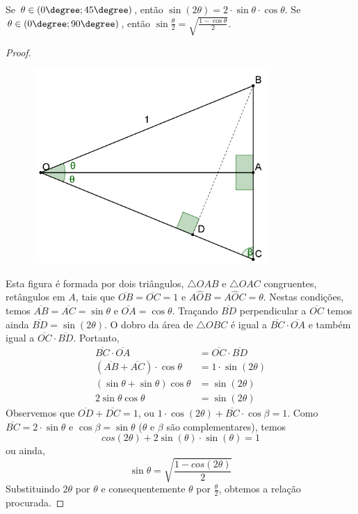 \begin{prop}
Se $\theta \in (0\degree;45\degree)$, então $\sin (2\theta) = 2\cdot\sin\theta\cdot\cos\theta$. Se $\theta \in (0\degree; 90\degree)$, então $\sin \frac{\theta}{2}=\sqrt{\frac{1-\cos \theta}{2}}$.
\begin{proof}
\begin{figure}[H]   %
\centering
\includegraphics[width=0.8\textwidth]{basic/images/trigo4}
\end{figure}
Esta figura é formada por dois triângulos, $\triangle OAB$ e $\triangle OAC$ congruentes, retângulos em $A$, tais que $\overline{OB}=\overline{OC}=1$ e $A\hat{O}B = A\hat{O}C = \theta$. Nestas condições, temos $\overline{AB}=\overline{AC}=\sin \theta$ e $\overline{OA}=\cos \theta$. Traçando $\overline{BD}$ perpendicular a $\overline{OC}$ temos ainda $\overline{BD}=\sin(2\theta)$. O dobro da área de $\triangle OBC$ é igual a $\overline{BC}\cdot\overline{OA}$ e também igual a $\overline{OC}\cdot\overline{BD}$. Portanto,
\begin{align*}
\overline{BC}\cdot\overline{OA} &= \overline{OC}\cdot\overline{BD}\\
(\overline{AB} + \overline{AC})\cdot \cos \theta &= 1 \cdot \sin(2\theta) \\
(\sin\theta+\sin\theta)\cos\theta &= \sin(2\theta) \\
2\sin\theta\cos\theta &= \sin(2\theta)
\end{align*}
Observemos que $\overline{OD}+\overline{DC}=1$, ou $1\cdot\cos(2\theta)+\overline{BC}\cdot\cos\beta=1$. Como $\overline{BC}=2\cdot \sin \theta $ e $\cos \beta = \sin \theta$ ($\theta$ e $\beta$ são complementares), temos
\[cos(2\theta)+2\sin(\theta)\cdot\sin(\theta)=1\]
ou ainda, \[\sin \theta = \sqrt{\dfrac{1-cos(2\theta)}{2}}\]
Substituindo $2\theta$ por $\theta$ e consequentemente $\theta$ por $\frac{\theta}{2}$, obtemos a relação procurada.
\end{proof}
\end{prop}